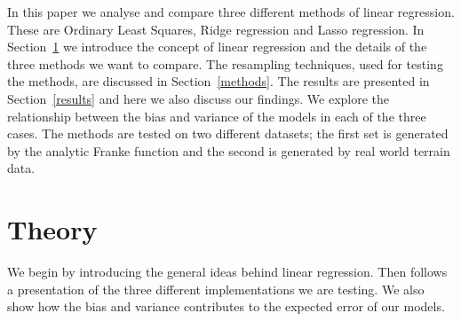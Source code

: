 \documentclass[a4paper, 
amsfonts, 
amssymb, 
amsmath, 
reprint, 
showkeys, 
nofootinbib, 
twoside]{revtex4-2}
\begin{document}
In this paper we analyse and compare three different methods of linear regression. These are Ordinary Least Squares, Ridge regression and Lasso regression. In Section~\ref{theory} we introduce the concept of linear regression and the details of the three methods we want to compare. The resampling techniques, used for testing the methods, are discussed in Section~\ref{methods}. The results are presented in Section~\ref{results} and here we also discuss our findings. We explore the relationship between the bias and variance of the models in each of the three cases. The methods are tested on two different datasets; the first set is generated by the analytic Franke function and the second is generated by real world terrain data.


\section{Theory}
\label{theory}

We begin by introducing the general ideas behind linear regression. Then follows a presentation of the three different implementations we are testing. We also show how the bias and variance contributes to the expected error of our models. 
\end{document}
